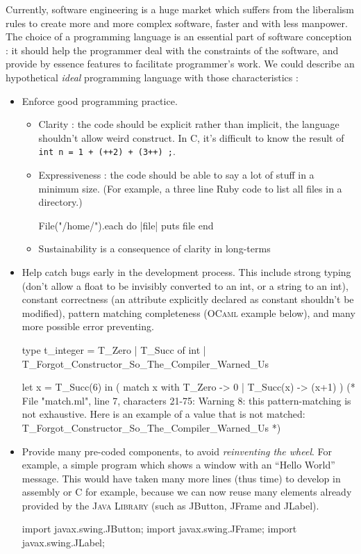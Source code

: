 \documentclass[a4paper]{article}
\begin{document}
Currently, software engineering is a huge market which suffers from the liberalism rules to create more and more complex software, faster and with less manpower. The choice of a programming language is an essential part of software conception : it should help the programmer deal with the constraints of the software, and provide by essence features to facilitate programmer's work. 
We could describe an hypothetical \emph{ideal} programming language with those characteristics :
\begin{itemize}
\item
Enforce good programming practice.
\begin{itemize}
\item
Clarity : the code should be explicit rather than implicit, the language shouldn't allow weird construct. In C, it's difficult to know the result of {\tt int n = 1 + (++2) + (3++) ;}.
\item
Expressiveness : the code should be able to say a lot of stuff in a minimum size. (For example, a three line Ruby code to list all files in a directory.)
\begin{rubycode}
File("/home/").each do |file|
	puts file
end
\end{rubycode}
\item
Sustainability is a consequence of clarity in long-terms
\end{itemize}
\item
Help catch bugs early in the development process. 
This include strong typing (don't allow a float to be invisibly converted to an int, or a string to an int), constant correctness (an attribute explicitly declared as constant shouldn't be modified), pattern matching completeness (\textsc{OCaml} example below), and many more possible error preventing.
\begin{ocamlcode}
type t_integer =
   T_Zero
  | T_Succ of int
  | T_Forgot_Constructor_So_The_Compiler_Warned_Us

let x = T_Succ(6) in (
match x with
   T_Zero -> 0
  | T_Succ(x) -> (x+1)
)
(*
File "match.ml", line 7, characters 21-75:
 Warning 8: this pattern-matching is not exhaustive.
Here is an example of a value that is not matched:
	 T_Forgot_Constructor_So_The_Compiler_Warned_Us
*)
\end{ocamlcode}

\item
Provide many pre-coded components, to avoid \emph{reinventing the wheel}.
For example, a simple program which shows a window with an ``Hello World'' message. This would have taken many more lines (thus time) to develop in assembly or C for example, because we can now reuse many elements already provided by the \textsc{Java Library} (such as JButton, JFrame and JLabel).
\begin{javacode}
import javax.swing.JButton;
import javax.swing.JFrame;
import javax.swing.JLabel;
 

\end{javacode}
\end{itemize}
\end{document}

